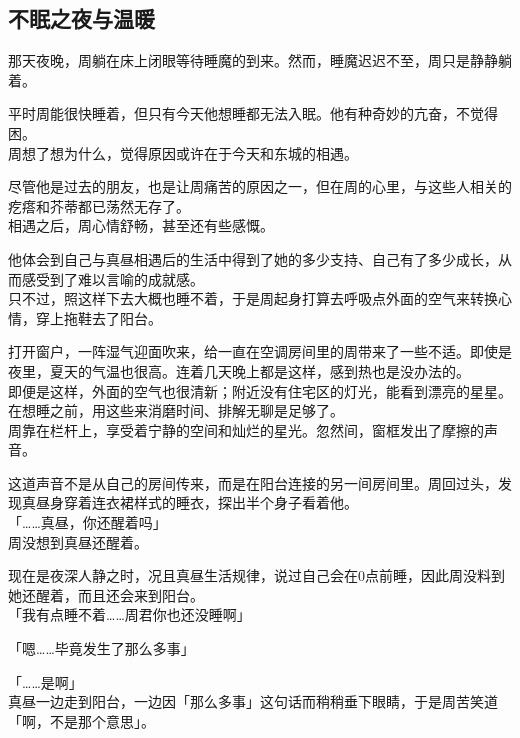 \subsection{不眠之夜与温暖}

那天夜晚，周躺在床上闭眼等待睡魔的到来。然而，睡魔迟迟不至，周只是静静躺着。

平时周能很快睡着，但只有今天他想睡都无法入眠。他有种奇妙的亢奋，不觉得困。\\

周想了想为什么，觉得原因或许在于今天和东城的相遇。

尽管他是过去的朋友，也是让周痛苦的原因之一，但在周的心里，与这些人相关的疙瘩和芥蒂都已荡然无存了。\\

相遇之后，周心情舒畅，甚至还有些感慨。

他体会到自己与真昼相遇后的生活中得到了她的多少支持、自己有了多少成长，从而感受到了难以言喻的成就感。\\

只不过，照这样下去大概也睡不着，于是周起身打算去呼吸点外面的空气来转换心情，穿上拖鞋去了阳台。

打开窗户，一阵湿气迎面吹来，给一直在空调房间里的周带来了一些不适。即使是夜里，夏天的气温也很高。连着几天晚上都是这样，感到热也是没办法的。\\

即便是这样，外面的空气也很清新；附近没有住宅区的灯光，能看到漂亮的星星。在想睡之前，用这些来消磨时间、排解无聊是足够了。\\

周靠在栏杆上，享受着宁静的空间和灿烂的星光。忽然间，窗框发出了摩擦的声音。

这道声音不是从自己的房间传来，而是在阳台连接的另一间房间里。周回过头，发现真昼身穿着连衣裙样式的睡衣，探出半个身子看着他。\\

「……真昼，你还醒着吗」\\

周没想到真昼还醒着。

现在是夜深人静之时，况且真昼生活规律，说过自己会在0点前睡，因此周没料到她还醒着，而且还会来到阳台。\\

「我有点睡不着……周君你也还没睡啊」

「嗯……毕竟发生了那么多事」

「……是啊」\\

真昼一边走到阳台，一边因「那么多事」这句话而稍稍垂下眼睛，于是周苦笑道「啊，不是那个意思」。\\

